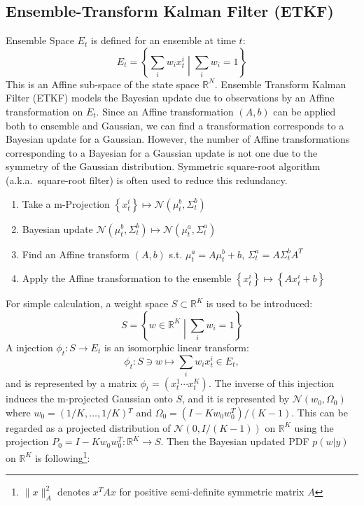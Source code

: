 \documentclass{article}
\newcommand{\set}[1]{\left\{ #1 \right\}}
\newcommand{\Set}[2]{\left\{ #1 \middle| #2 \right\}}
\newcommand{\Normal}{\mathcal{N}}
\newcommand{\Real}{\mathbb{R}}
\begin{document}
\subsection{Ensemble-Transform Kalman Filter (ETKF)}
Ensemble Space $E_t$ is defined for an ensemble  at time $t$:
\begin{equation}
  E_t = \Set{\sum_i w_i x_t^i}{\sum_i w_i = 1}
\end{equation}
This is an Affine sub-space of the state space $\Real^N$.
Ensemble Transform Kalman Filter (ETKF) models the Bayesian update due to observations by an Affine transformation on $E_t$.
Since an Affine transformation $(A, b)$ can be applied both to ensemble and Gaussian,
we can find a transformation corresponds to a Bayesian update for a Gaussian.
However, the number of Affine transformations corresponding to a Bayesian
for a Gaussian update is not one due to the symmetry of the Gaussian distribution.
Symmetric square-root algorithm (a.k.a.\ square-root filter) is often used to reduce this redundancy.
\begin{enumerate}
  \item Take a m-Projection $\set{x_t^i} \mapsto \Normal(\mu_t^b, \Sigma_t^b)$ 
  \item Bayesian update $\Normal(\mu_t^b, \Sigma_t^b) \mapsto \Normal(\mu_t^a, \Sigma_t^a)$
  \item Find an Affine transform $(A, b)$ s.t. $\mu_t^a = A \mu_t^b + b$, $\Sigma_t^a = A \Sigma_t^b A^T$
  \item Apply the Affine transformation to the ensemble $\set{x_t^i} \mapsto \set{Ax_t^i + b}$
\end{enumerate}
For simple calculation, a weight space $S \subset \Real^K$ is used to be introduced:
\begin{equation}
  S = \Set{w \in \Real^K}{\sum_i w_i = 1}
\end{equation}
A injection $\phi_t: S \to E_t$ is an isomorphic linear transform:
\begin{equation}
  \phi_t: S \ni w \mapsto \sum_i w_i x_t^i \in E_t,
\end{equation}
and is represented by a matrix $\phi_t = (x_t^1 \cdots x_t^K)$.
The inverse of this injection induces the m-projected Gaussian onto $S$,
and it is represented by $\Normal(w_0, \Omega_0)$
where $w_0 = (1/K, \ldots, 1/K){}^T$ and $\Omega_0 = (I - K w_0 w_0^T) / (K-1)$.
This can be regarded as a projected distribution of $\Normal(0, I/(K-1))$ on $\Real^K$ using the projection $P_0 = I - K w_0 w_0^T: \Real^K \to S$.
Then the Bayesian updated PDF $p(w | y)$ on $\Real^K$ is following\footnote{$\| x \|_A^2$ denotes $x^T A x$ for positive semi-definite symmetric matrix $A$}:
\end{document}
